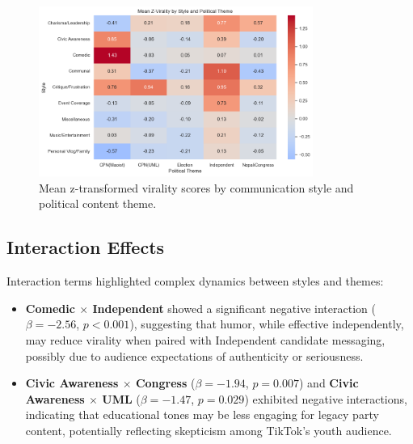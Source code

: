 \documentclass[12pt,a4paper]{report}
\begin{document}
\begin{figure}[ht]
\centering
\includegraphics[width=0.8\textwidth]{figures/RQ2/Mean_Z_Virality.png}
\caption{Mean z-transformed virality scores by communication style and political content theme.}
\label{fig:Mean_Z_Virality}
\end{figure}
\newpage
\subsection{Interaction Effects}
Interaction terms highlighted complex dynamics between styles and themes:
\begin{itemize}[noitemsep]
    \item \textbf{Comedic \(\times\) Independent} showed a significant negative interaction (\( \beta = -2.56 \), \( p < 0.001 \)), suggesting that humor, while effective independently, may reduce virality when paired with Independent candidate messaging, possibly due to audience expectations of authenticity or seriousness.
    \item \textbf{Civic Awareness \(\times\) Congress} (\( \beta = -1.94 \), \( p = 0.007 \)) and \textbf{Civic Awareness \(\times\) UML} (\( \beta = -1.47 \), \( p = 0.029 \)) exhibited negative interactions, indicating that educational tones may be less engaging for legacy party content, potentially reflecting skepticism among TikTok’s youth audience.
\end{itemize}
\end{document}
